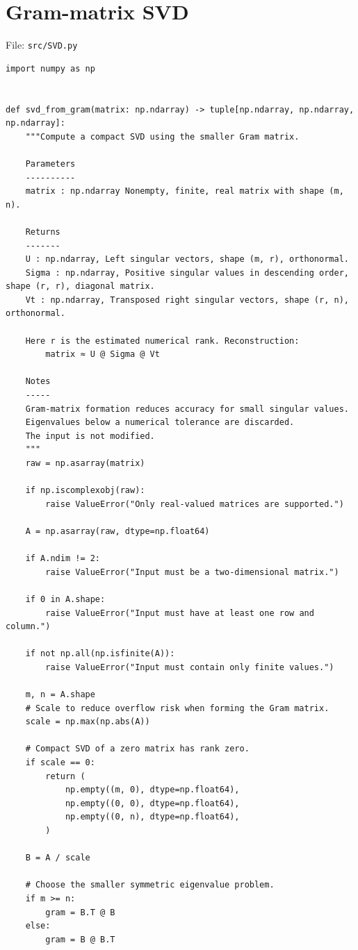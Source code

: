 \documentclass[12pt,a4paper]{report}
\theoremstyle{plain}
\theoremstyle{definition}
\theoremstyle{remark}
\theoremstyle{definition}
\begin{document}
\section{Gram-matrix SVD}
\noindent File: \texttt{src/SVD.py}
\begin{lstlisting}
import numpy as np


def svd_from_gram(matrix: np.ndarray) -> tuple[np.ndarray, np.ndarray, np.ndarray]:
    """Compute a compact SVD using the smaller Gram matrix.

    Parameters
    ----------
    matrix : np.ndarray Nonempty, finite, real matrix with shape (m, n).

    Returns
    -------
    U : np.ndarray, Left singular vectors, shape (m, r), orthonormal.
    Sigma : np.ndarray, Positive singular values in descending order, shape (r, r), diagonal matrix.
    Vt : np.ndarray, Transposed right singular vectors, shape (r, n), orthonormal.

    Here r is the estimated numerical rank. Reconstruction:
        matrix ≈ U @ Sigma @ Vt

    Notes
    -----
    Gram-matrix formation reduces accuracy for small singular values.
    Eigenvalues below a numerical tolerance are discarded.
    The input is not modified.
    """
    raw = np.asarray(matrix)

    if np.iscomplexobj(raw):
        raise ValueError("Only real-valued matrices are supported.")

    A = np.asarray(raw, dtype=np.float64)

    if A.ndim != 2:
        raise ValueError("Input must be a two-dimensional matrix.")

    if 0 in A.shape:
        raise ValueError("Input must have at least one row and column.")

    if not np.all(np.isfinite(A)):
        raise ValueError("Input must contain only finite values.")

    m, n = A.shape
    # Scale to reduce overflow risk when forming the Gram matrix.
    scale = np.max(np.abs(A))
    
    # Compact SVD of a zero matrix has rank zero.
    if scale == 0:
        return (
            np.empty((m, 0), dtype=np.float64),
            np.empty((0, 0), dtype=np.float64),
            np.empty((0, n), dtype=np.float64),
        )

    B = A / scale

    # Choose the smaller symmetric eigenvalue problem.
    if m >= n:
        gram = B.T @ B
    else:
        gram = B @ B.T


\end{lstlisting}
\end{document}
